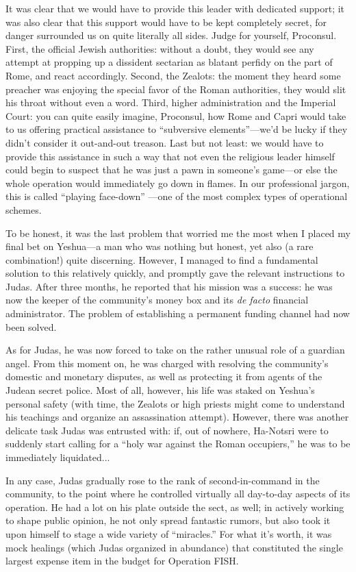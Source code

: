 It was clear that we would have to provide this leader with dedicated support; it was also clear that this support would have to be kept completely secret, for danger surrounded us on quite literally all sides. Judge for yourself, Proconsul. First, the official Jewish authorities: without a doubt, they would see any attempt at propping up a dissident sectarian as blatant perfidy on the part of Rome, and react accordingly. Second, the Zealots: the moment they heard some preacher was enjoying the special favor of the Roman authorities, they would slit his throat without even a word. Third, higher administration and the Imperial Court: you can quite easily imagine, Proconsul, how Rome and Capri would take to us offering practical assistance to ``subversive elements''---we'd be lucky if they didn't consider it out-and-out treason. Last but not least: we would have to provide this assistance in such a way that not even the religious leader himself could begin to suspect that he was just a pawn in someone's game---or else the whole operation would immediately go down in flames. In our professional jargon, this is called ``playing face-down'' ---one of the most complex types of operational schemes.

To be honest, it was the last problem that worried me the most when I placed my final bet on Yeshua---a man who was nothing but honest, yet also (a rare combination!) quite discerning. However, I managed to find a fundamental solution to this relatively quickly, and promptly gave the relevant instructions to Judas. After three months, he reported that his mission was a success: he was now the keeper of the community's money box and its \emph{de facto} financial administrator. The problem of establishing a permanent funding channel had now been solved.

As for Judas, he was now forced to take on the rather unusual role of a guardian angel. From this moment on, he was charged with resolving the community's domestic and monetary disputes, as well as protecting it from agents of the Judean secret police. Most of all, however, his life was staked on Yeshua's personal safety (with time, the Zealots or high priests might come to understand his teachings and organize an assassination attempt). However, there was another delicate task Judas was entrusted with: if, out of nowhere, Ha-Notsri were to suddenly start calling for a ``holy war against the Roman occupiers,'' he was to be immediately liquidated...

In any case, Judas gradually rose to the rank of second-in-command in the community, to the point where he controlled virtually all day-to-day aspects of its operation. He had a lot on his plate outside the sect, as well; in actively working to shape public opinion, he not only spread fantastic rumors, but also took it upon himself to stage a wide variety of ``miracles.'' For what it's worth, it was mock healings (which Judas organized in abundance) that constituted the single largest expense item in the budget for Operation FISH.


